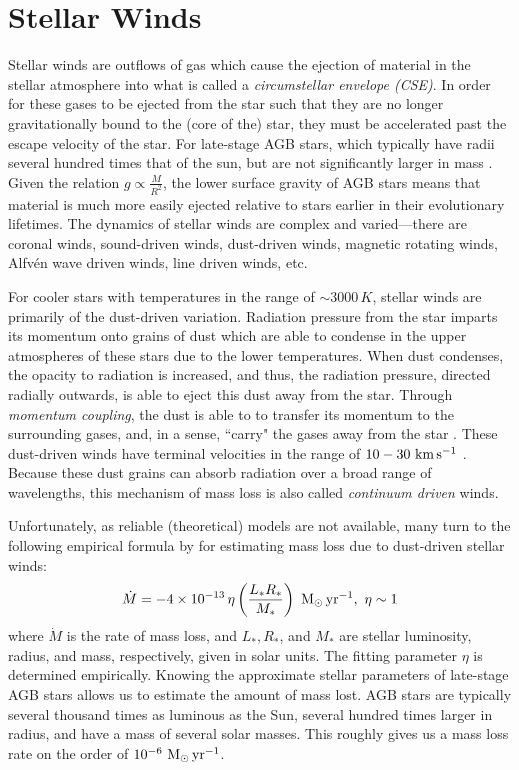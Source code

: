 \documentclass[twocolumn]{aastex63}
\begin{document}
\section{Stellar Winds} \label{sec:winds}

Stellar winds are outflows of gas which cause the ejection of material in the stellar atmosphere into what is called a \textit{circumstellar envelope (CSE)}. In order for these gases to be ejected from the star such that they are no longer gravitationally bound to the (core of the) star, they must be accelerated past the escape velocity of the star. For late-stage AGB stars, which typically have radii several hundred times that of the sun, but are not significantly larger in mass \citep{hofner}. Given the relation $g \propto \frac{M}{R^2}$, the lower surface gravity of AGB stars means that material is much more easily ejected relative to stars earlier in their evolutionary lifetimes. The dynamics of stellar winds are complex and varied—there are coronal winds, sound-driven winds, dust-driven winds, magnetic rotating winds, Alfv\'en wave driven winds, line driven winds, etc. \citep{lamers}

For cooler stars with temperatures in the range of $\sim 3000\,K$, stellar winds are primarily of the dust-driven variation. Radiation pressure from the star imparts its momentum onto grains of dust which are able to condense in the upper atmospheres of these stars due to the lower temperatures. When dust condenses, the opacity to radiation is increased, and thus, the radiation pressure, directed radially outwards, is able to eject this dust away from the star. Through \textit{momentum coupling}, the dust is able to to transfer its momentum to the surrounding gases, and, in a sense, ``carry" the gases away from the star \citep{gilman}. These dust-driven winds have terminal velocities in the range of $10-30~{\rm km\,s^{-1}}$ \citep{lamers}. Because these dust grains can absorb radiation over a broad range of wavelengths, this mechanism of mass loss is also called \textit{continuum driven} winds. 


Unfortunately, as reliable (theoretical) models are not available, many turn to the following empirical formula by \cite{reimers} for estimating mass loss due to dust-driven stellar winds:
\begin{equation}\label{eq:reimers}
    \dot M = -4\times 10^{-13}\,\eta \left(\frac{L_*R_*}{M_*}\right)~{\rm M_\odot\,yr^{-1}},~{\rm \eta \sim 1}
\end{equation}
where $\dot M$ is the rate of mass loss, and $L_*, R_*$, and $M_*$ are stellar luminosity, radius, and mass, respectively, given in solar units. The fitting parameter $\eta$ is determined empirically. Knowing the approximate stellar parameters of late-stage AGB stars allows us to estimate the amount of mass lost. AGB stars are typically several thousand times as luminous as the Sun, several hundred times larger in radius, and have a mass of several solar masses. This roughly gives us a mass loss rate on the order of $10^{-6}~{\rm M_\odot\,yr^{-1}}$.
\end{document}
